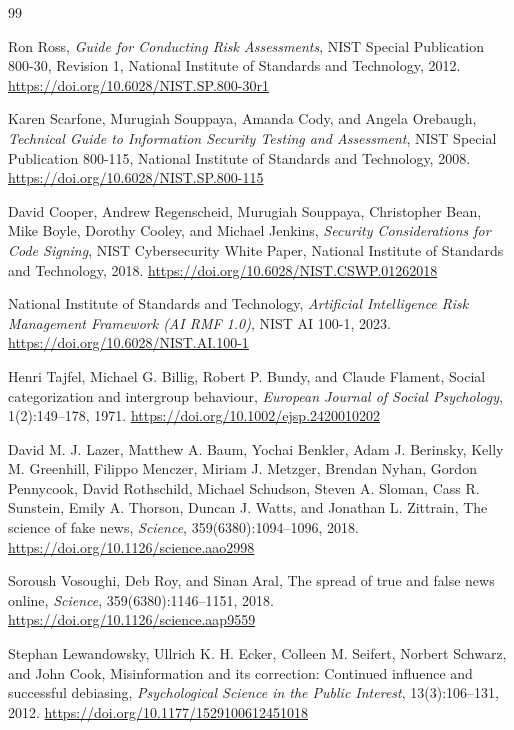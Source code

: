 \documentclass[11pt]{article}
\begin{document}
\begin{thebibliography}{99}

Ron Ross,
\newblock \emph{Guide for Conducting Risk Assessments},
\newblock NIST Special Publication 800-30, Revision 1,
National Institute of Standards and Technology, 2012.
\newblock \url{https://doi.org/10.6028/NIST.SP.800-30r1}

Karen Scarfone, Murugiah Souppaya, Amanda Cody, and Angela Orebaugh,
\newblock \emph{Technical Guide to Information Security Testing and Assessment},
\newblock NIST Special Publication 800-115,
National Institute of Standards and Technology, 2008.
\newblock \url{https://doi.org/10.6028/NIST.SP.800-115}

David Cooper, Andrew Regenscheid, Murugiah Souppaya,
Christopher Bean, Mike Boyle, Dorothy Cooley, and Michael Jenkins,
\newblock \emph{Security Considerations for Code Signing},
\newblock NIST Cybersecurity White Paper,
National Institute of Standards and Technology, 2018.
\newblock \url{https://doi.org/10.6028/NIST.CSWP.01262018}

National Institute of Standards and Technology,
\newblock \emph{Artificial Intelligence Risk Management Framework
(AI RMF 1.0)},
\newblock NIST AI 100-1, 2023.
\newblock \url{https://doi.org/10.6028/NIST.AI.100-1}

Henri Tajfel, Michael G. Billig, Robert P. Bundy, and Claude Flament,
\newblock Social categorization and intergroup behaviour,
\newblock \emph{European Journal of Social Psychology},
1(2):149--178, 1971.
\newblock \url{https://doi.org/10.1002/ejsp.2420010202}

David M. J. Lazer, Matthew A. Baum, Yochai Benkler, Adam J. Berinsky,
Kelly M. Greenhill, Filippo Menczer, Miriam J. Metzger, Brendan Nyhan,
Gordon Pennycook, David Rothschild, Michael Schudson,
Steven A. Sloman, Cass R. Sunstein, Emily A. Thorson,
Duncan J. Watts, and Jonathan L. Zittrain,
\newblock The science of fake news,
\newblock \emph{Science}, 359(6380):1094--1096, 2018.
\newblock \url{https://doi.org/10.1126/science.aao2998}

Soroush Vosoughi, Deb Roy, and Sinan Aral,
\newblock The spread of true and false news online,
\newblock \emph{Science}, 359(6380):1146--1151, 2018.
\newblock \url{https://doi.org/10.1126/science.aap9559}

Stephan Lewandowsky, Ullrich K. H. Ecker, Colleen M. Seifert,
Norbert Schwarz, and John Cook,
\newblock Misinformation and its correction: Continued influence and
successful debiasing,
\newblock \emph{Psychological Science in the Public Interest},
13(3):106--131, 2012.
\newblock \url{https://doi.org/10.1177/1529100612451018}


\end{thebibliography}
\end{document}
